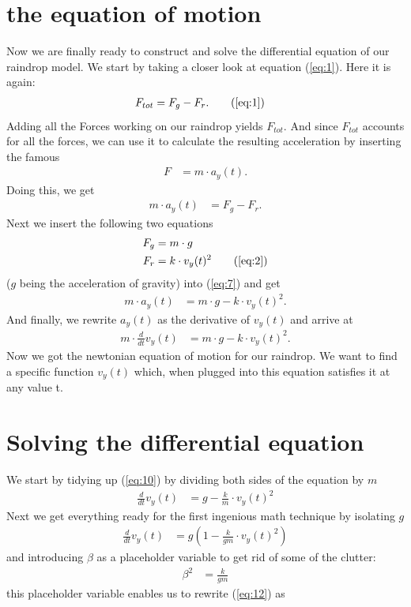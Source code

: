 \documentclass[paper=a4, fontsize=11pt]{scrartcl} %
\numberwithin{equation}{section} %
\numberwithin{figure}{section} %
\numberwithin{table}{section} %
\begin{document}
\section{the equation of motion}
Now we are finally ready to construct and solve the differential equation of our raindrop model.
We start by taking a closer look at equation (\ref{eq:1}). Here it is again:
\begin{align}
F_{tot} &= F_g - F_r. \tag{\ref{eq:1}}
\end{align}
Adding all the Forces working on our raindrop yields $F_{tot}$. And since $F_{tot}$ accounts for all the forces, we can use it to
calculate the resulting acceleration by inserting the famous 
\begin{align} \label{eq:6}
F &= m \cdot a_y(t).
\end{align}
Doing this, we get
\begin{align} \label{eq:7}
m \cdot a_y(t) &= F_g - F_r. 
\end{align}
Next we insert the following two equations 
\begin{align}
F_g &= m \cdot g \label{eq:8} \\
F_r &= k \cdot v_y(t)^2 \tag{\ref{eq:2}}
\end{align}
($g$ being the acceleration of gravity) into (\ref{eq:7}) and get
\begin{align} \label{eq:9}
m \cdot a_y(t) &= m \cdot g - k \cdot v_y(t)^2. 
\end{align}
And finally, we rewrite $a_y(t)$ as the derivative of $v_y(t)$ and arrive at
\begin{align} \label{eq:10}
m \cdot \frac{d}{dt} v_y(t) &= m \cdot g - k \cdot v_y(t)^2. 
\end{align}
Now we got the newtonian equation of motion for our raindrop. We want to find a specific function $v_y(t)$ which, 
when plugged into this equation satisfies it at any value t.
\section{Solving the differential equation}
We start by tidying up (\ref{eq:10}) by dividing both sides of the equation by $m$
\begin{align} \label{eq:11}
\frac{d}{dt} v_y(t) &= g - \frac{k}{m} \cdot v_y(t)^2
\end{align}
Next we get everything ready for the first ingenious math technique by isolating $g$
\begin{align} \label{eq:12}
\frac{d}{dt} v_y(t) &= g \left(1 - \frac{k}{gm} \cdot v_y(t)^2\right)
\end{align}
and introducing $\beta$ as a placeholder variable to get rid of some of the clutter:
\begin{align} \label{eq:13}
\beta^2 &= \frac{k}{gm}
\end{align}
this placeholder variable enables us to rewrite (\ref{eq:12}) as
\end{document}
